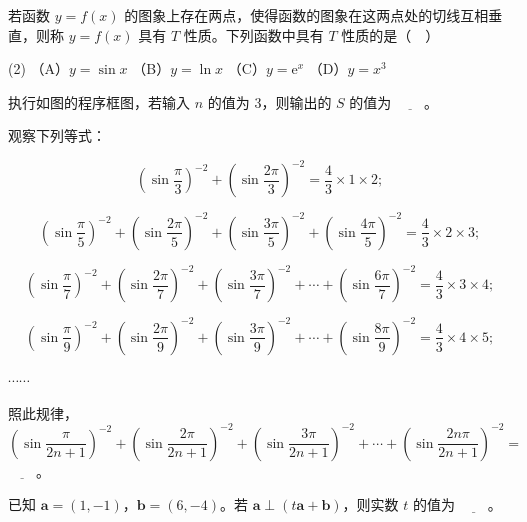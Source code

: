 \begin{question}
若函数 \(y=f(x)\) 的图象上存在两点，使得函数的图象在这两点处的切线互相垂直，则称 \(y=f(x)\) 具有 \(T\) 性质。下列函数中具有 \(T\) 性质的是（　）

\begin{gkopts}(2)
\task （A）\(y=\sin x\)
\task （B）\(y=\ln x\)
\task （C）\(y=\mathrm{e}^x\)
\task （D）\(y=x^3\)
\end{gkopts}

\end{question}

\Needspace{0.4\textheight}
\begin{question}
执行如图的程序框图，若输入 \(n\) 的值为 3，则输出的 \(S\) 的值为 \(\underline{\qquad}\)。
\nopagebreak[4]
\begin{center}\end{center}
\nopagebreak[4]
\end{question}
\begin{question}
观察下列等式：

\nopagebreak[4]
\[
\left(\sin\dfrac{\pi}{3}\right)^{-2}+\left(\sin\dfrac{2\pi}{3}\right)^{-2}=\dfrac{4}{3}\times 1\times 2;
\]

\nopagebreak[4]
\[
\left(\sin\dfrac{\pi}{5}\right)^{-2}+\left(\sin\dfrac{2\pi}{5}\right)^{-2}+\left(\sin\dfrac{3\pi}{5}\right)^{-2}+\left(\sin\dfrac{4\pi}{5}\right)^{-2}=\dfrac{4}{3}\times 2\times 3;
\]

\nopagebreak[4]
\[
\left(\sin\dfrac{\pi}{7}\right)^{-2}+\left(\sin\dfrac{2\pi}{7}\right)^{-2}+\left(\sin\dfrac{3\pi}{7}\right)^{-2}+\cdots+\left(\sin\dfrac{6\pi}{7}\right)^{-2}=\dfrac{4}{3}\times 3\times 4;
\]

\nopagebreak[4]
\[
\left(\sin\dfrac{\pi}{9}\right)^{-2}+\left(\sin\dfrac{2\pi}{9}\right)^{-2}+\left(\sin\dfrac{3\pi}{9}\right)^{-2}+\cdots+\left(\sin\dfrac{8\pi}{9}\right)^{-2}=\dfrac{4}{3}\times 4\times 5;
\]

\(\cdots\cdots\)

照此规律，\(\left(\sin\dfrac{\pi}{2n+1}\right)^{-2}+\left(\sin\dfrac{2\pi}{2n+1}\right)^{-2}+\left(\sin\dfrac{3\pi}{2n+1}\right)^{-2}+\cdots+\left(\sin\dfrac{2n\pi}{2n+1}\right)^{-2}=\) \(\underline{\qquad}\)。

\end{question}
\begin{question}
已知 \(\boldsymbol{a}=(1,-1)\)，\(\boldsymbol{b}=(6,-4)\)。若 \(\boldsymbol{a}\perp(t\boldsymbol{a}+\boldsymbol{b})\)，则实数 \(t\) 的值为 \(\underline{\qquad}\)。

\end{question}
